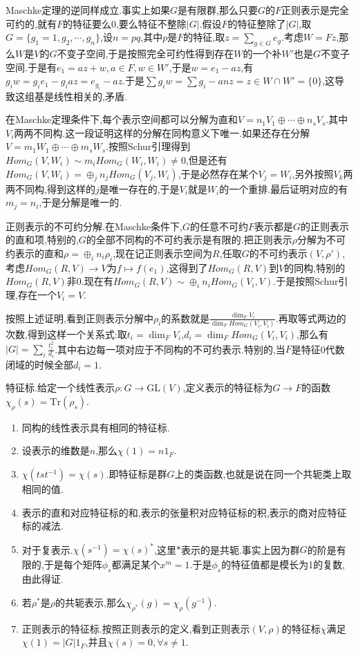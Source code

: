 Maschke定理的逆同样成立.事实上如果$G$是有限群,那么只要$G$的$F$正则表示是完全可约的,就有$F$的特征要么0,要么特征不整除$|G|$.假设$F$的特征整除了$|G| $,取$G=\{g_1=1,g_2,\cdots,g_n\}$,设$n=pq$,其中$p$是$F$的特征,取$z=\sum_{g\in G}e_g$.考虑$W=Fz$,那么$W$是$V$的$G$不变子空间,于是按照完全可约性得到存在$W$的一个补$W'$也是$G$不变子空间.于是有$e_1=az+w,a\in F,w\in W'$,于是$w=e_1-az$,有$g_iw=g_ie_1-g_iaz=e_{g_i}-az$.于是$\sum g_iw=\sum g_i-anz=z\in W\cap W'=\{0\}$,这导致这组基是线性相关的,矛盾.

在Maschke定理条件下,每个表示空间都可以分解为直和$V=n_1V_1\oplus\cdots\oplus n_sV_s$.其中$V_i$两两不同构.这一段证明这样的分解在同构意义下唯一.如果还存在分解$V=m_1W_1\oplus\cdots\oplus m_sW_s$.按照Schur引理得到$Hom_G(V,W_i)\sim m_iHom_G(W_i,W_i)\not=0$,但是还有$Hom_G(V,W_i)=\oplus_j n_jHom_G(V_j,W_i)$,于是必然存在某个$V_j=W_i$,另外按照$V_k$两两不同构,得到这样的$j$是唯一存在的,于是$V_i$就是$W_i$的一个重排.最后证明对应的有$m_j=n_i$,于是分解是唯一的.

正则表示的不可约分解.在Maschke条件下,$G$的任意不可约$F$表示都是$G$的正则表示的直和项,特别的,$G$的全部不同构的不可约表示是有限的.把正则表示$\rho$分解为不可约表示的直和$\rho=\oplus_in_i\rho_i$,现在记正则表示空间为$R$,任取$G$的不可约表示$(V,\rho')$,考虑$Hom_G(R,V)\to V$为$f\mapsto f(e_1)$,这得到了$Hom_G(R,V)$到$V$的同构,特别的$Hom_G(R,V)$非0.现在有$Hom_G(R,V)\sim\oplus_i n_iHom_G(V_i,V)$.于是按照Schur引理,存在一个$V_i=V$.

按照上述证明,看到正则表示分解中$\rho_i$的系数就是$\frac{\dim_FV_i} {\dim_F Hom_G(V_i,V_i)}$.再取等式两边的次数,得到这样一个关系式:取$t_i=\dim_FV_i$,$d_i=\dim_F Hom_G(V_i,V_i)$,那么有$|G|=\sum_i\frac{t_i^2}{d_i}$.其中右边每一项对应于不同构的不可约表示.特别的,当$F$是特征0代数闭域的时候全部$d_i=1$.

特征标.给定一个线性表示$\rho:G\to\mathrm{GL}(V)$,定义表示的特征标为$G\to F$的函数$\chi_{\rho}(s)=\mathrm{Tr}(\rho_s)$.
\begin{enumerate}
  \item 同构的线性表示具有相同的特征标.
  \item 设表示的维数是$n$,那么$\chi(1)=n1_F$.
  \item $\chi(tst^{-1})=\chi(s)$.即特征标是群$G$上的类函数,也就是说在同一个共轭类上取相同的值.
  \item 表示的直和对应特征标的和,表示的张量积对应特征标的积,表示的商对应特征标的减法.
  \item 对于复表示.$\chi(s^{-1})=\chi(s)^*$,这里$*$表示的是共轭.事实上因为群$G$的阶是有限的,于是每个矩阵$\phi_s$都满足某个$x^m=1$.于是$\phi_s$的特征值都是模长为1的复数,由此得证.
  \item 若$\rho^*$是$\rho$的共轭表示,那么$\chi_ {\rho^*}(g)=\chi_{\rho}(g^{-1})$.
  \item 正则表示的特征标.按照正则表示的定义,看到正则表示$(V,\rho)$的特征标$\chi$满足$\chi(1)=|G|1_F$,并且$\chi(s)=0,\forall s\not=1$.
\end{enumerate}

